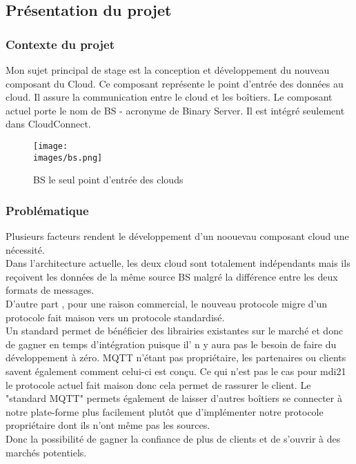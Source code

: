         \subsection{Présentation du projet}
        \subsubsection{Contexte du projet}
            Mon sujet principal de stage est la conception et développement du nouveau composant du Cloud. Ce composant représente 
            le point d'entrée des données au cloud. Il assure la communication entre le cloud et les boîtiers. 
            Le composant actuel porte le nom de \gls{BS} - acronyme de Binary Server. Il est intégré seulement dans CloudConnect.
            \begin{figure}[ht]
                \centering
                \texttt{[image: \\images/bs.png]}
                \caption{BS le seul point d'entrée des clouds }
            \end{figure}
           
        \subsubsection{Problématique}
            Plusieurs facteurs  rendent le développement d'un noouevau composant cloud une nécessité. 
            \\Dans l’architecture actuelle, les deux cloud sont totalement indépendants mais ils reçoivent les données 
            de la même source \gls{BS} malgré la différence entre les deux formats de messages. \\ 

            D'autre part , pour une raison commercial, le nouveau protocole migre d'un protocole fait maison vers un protocole standardisé. \\
            Un standard permet de bénéficier des librairies existantes sur le marché et donc de gagner en temps d'intégration puisque 
            il' n y aura pas le besoin de faire du développement à zéro.
            MQTT n'étant pas propriétaire, les partenaires ou clients savent également comment celui-ci est conçu. Ce qui n'est pas le cas 
            pour \gls{mdi21} \- le protocole actuel fait maison \-  donc cela permet de rassurer le client. 
            Le "standard MQTT" permets également de laisser d'autres boîtiers se connecter à notre plate-forme plus facilement 
            plutôt que d'implémenter notre protocole propriétaire dont ils n'ont même pas les sources. \\
            Donc la possibilité de gagner la confiance de plus de clients et de s'ouvrir à des marchés potentiels.


